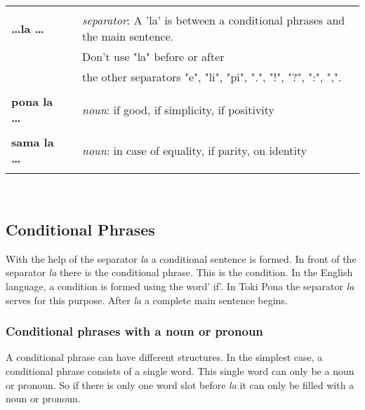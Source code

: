 \begin{supertabular}{p{2,5cm}|ll}
                              &  &                                                                                    \\ %
    \textbf{\dots la \dots}   &  & \textit{separator}: A 'la' is between a conditional phrases and the main sentence. \\ &&  Don't use "la" before or after \\ && the other separators "e", "li", "pi", ".", "!", "?", ":", ",".  \\ %
                              &  &                                                                                    \\ %
    \textbf{pona la \dots}    &  & \textit{noun}: if good, if simplicity, if positivity                               \\ %
                              &  &                                                                                    \\ %
    \textbf{sama la \dots}    &  & \textit{noun}: in case of equality, if parity, on identity                         \\
                              &  &                                                                                    \\ %
\end{supertabular} \\
%
\newpage
%
\subsection*{Conditional Phrases}
%
%
With the help of the separator \textit{la} a conditional sentence is formed.
In front of the separator \textit{la} there is the conditional phrase.
This is the condition.
In the English language, a condition is formed using the word' if'.
In Toki Pona the separator \textit{la} serves for this purpose.
After \textit{la} a complete main sentence begins.

%
\subsubsection*{Conditional phrases with a noun or pronoun}
%
%
A conditional phrase can have different structures.
In the simplest case, a conditional phrase consists of a single word.
This single word can only be a noun or pronoun.
So if there is only one word slot before \textit{la} it can only be filled with a noun or pronoun.

